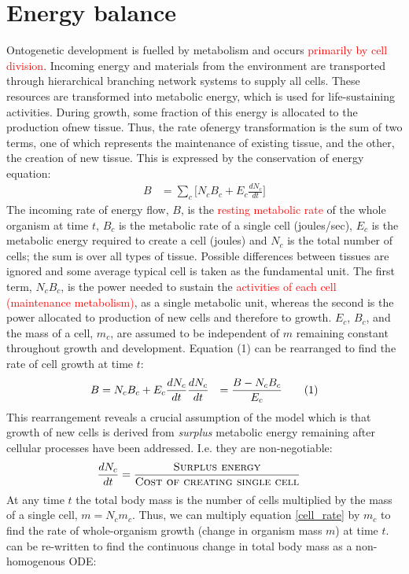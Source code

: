 \documentclass[a4paper]{article} %
\newcommand\numberthis{\addtocounter{equation}{1}\tag{\theequation}}
\begin{document}
\section{Energy balance}
Ontogenetic development is fuelled by metabolism and occurs \textcolor{red}{primarily by cell division}. Incoming energy and materials from the environment are transported through hierarchical branching network systems to supply all cells. These resources are transformed into metabolic energy, which is used for life-sustaining activities. During growth, some fraction of this energy is allocated to the production ofnew tissue. Thus, the rate ofenergy transformation is the sum of two terms, one of which represents the maintenance of existing tissue, and the other, the creation of new tissue. This is expressed by the conservation of energy equation:
\begin{align}
    B &= \sum_c \Bigg[N_{c}B_{c} + E_{c}\frac{dN_{c}}{dt}\Bigg]
\end{align}
The incoming rate of energy flow, $B$, is the \textcolor{red}{resting metabolic rate} of the whole organism at time $t$, $B_c$ is the metabolic rate of a single cell (joules/sec), $E_c$ is the metabolic energy required to create a cell (joules) and $N_c$ is the total number of cells; the sum is over all types of tissue. Possible differences between tissues are ignored and some average typical cell is taken as the fundamental unit. The first term, $N_{c}B_{c}$, is the power needed to sustain the \textcolor{red}{activities of each cell (maintenance metabolism)}, as a single metabolic unit, whereas the second is the power allocated to production of new cells and therefore to growth. $E_c$, $B_c$, and the mass of a cell, $m_c$, are assumed to be independent of $m$ remaining constant throughout growth and development. Equation (1) can be rearranged to find the rate of cell growth at time $t$: 
\begin{align*}
    B &= N_{c}B_{c} + E_{c}\frac{dN_{c}}{dt}
    \frac{dN_{c}}{dt} &= \frac{B - N_{c}B_{c}}{E_{c}} \numberthis \label{cell_rate}
\end{align*}
This rearrangement reveals a crucial assumption of the model which is that growth of new cells is derived from \textit{surplus} metabolic energy remaining after cellular processes have been addressed. I.e. they are non-negotiable:
\begin{align*}    
    \frac{dN_{c}}{dt} &= \frac{\textsc{Surplus energy}}{\textsc{Cost of creating single cell}}
\end{align*}
At any time $t$ the total body mass is the number of cells multiplied by the mass of a single cell, $m = N_{c}m_{c}$. Thus, we can multiply equation \eqref{cell_rate} by $m_{c}$ to find the rate of whole-organism growth (change in organism mass $m$) at time $t$. can be re-written to find the continuous change in total body mass as a non-homogenous ODE:
\end{document}
